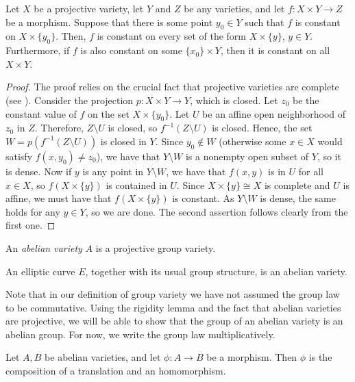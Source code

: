 \begin{lemma}\label{rigidity}
	Let $X$ be a projective variety, let $Y$ and $Z$ be any varieties, and let $f:X\times Y\rightarrow Z$ be a morphism. Suppose that there is some point $y_0\in Y$ such that $f$ is constant on $X\times\{y_0\}$. Then, $f$ is constant on every set of the form $X\times\{y\}$, $y\in Y$. Furthermore, if $f$ is also constant on some $\{x_0\}\times Y$, then it is constant on all $X\times Y$.
\end{lemma}
\begin{proof}
	The proof relies on the crucial fact that projective varieties are complete (see \cite{Hartshorne_1977}). Consider the projection $p:X\times Y\rightarrow Y$, which is closed. Let $z_0$ be the constant value of $f$ on the set $X\times\{y_0\}$. Let $U$ be an affine open neighborhood of $z_0$ in $Z$. Therefore, $Z\setminus U$ is closed, so $f^{-1}(Z\setminus U)$ is closed. Hence, the set $W=p(f^{-1}(Z\setminus U))$ is closed in $Y$. Since $y_0\not\in W$ (otherwise some $x\in X$ would satisfy $f(x,y_0)\neq z_0$), we have that $Y\setminus W$ is a nonempty open subset of $Y$, so it is dense. Now if $y$ is any point in $Y\setminus W$, we have that $f(x,y)$ is in $U$ for all $x\in X$, so $f(X\times\{y\})$ is contained in $U$. Since $X\times\{y\}\cong X$ is complete and $U$ is affine, we must have that $f(X\times\{y\})$ is constant. As $Y\setminus W$ is dense, the same holds for any $y\in Y$, so we are done. The second assertion follows clearly from the first one.
\end{proof}
\begin{definition}
	An \emph{abelian variety} $A$ is a projective group variety.
\end{definition}
\begin{example}
	An elliptic curve $E$, together with its usual group structure, is an abelian variety.
\end{example}
Note that in our definition of group variety we have not assumed the group law to be commutative. Using the rigidity lemma and the fact that abelian varieties are projective, we will be able to show that the group of an abelian variety is an abelian group. For now, we write the group law multiplicatively.
\begin{proposition}\label{morphism}
	Let $A,B$ be abelian varieties, and let $\phi:A\rightarrow B$ be a morphism. Then $\phi$ is the composition of a translation and an homomorphism.
\end{proposition}
